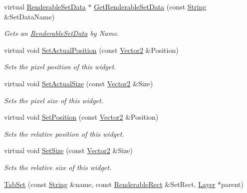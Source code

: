 \begin{DoxyCompactItemize}
virtual \hyperlink{structMezzanine_1_1UI_1_1RenderableSetData}{RenderableSetData} $\ast$ \hyperlink{classMezzanine_1_1UI_1_1TabSet_ab70db8423339f4ad5c11070201e42cc2}{GetRenderableSetData} (const \hyperlink{namespaceMezzanine_acf9fcc130e6ebf08e3d8491aebcf1c86}{String} \&SetDataName)
\begin{DoxyCompactList}\small\item\em Gets an \hyperlink{structMezzanine_1_1UI_1_1RenderableSetData}{RenderableSetData} by Name. \item\end{DoxyCompactList}\item 
virtual void \hyperlink{classMezzanine_1_1UI_1_1TabSet_ac4cb545982397148d0df237eee062cb3}{SetActualPosition} (const \hyperlink{classMezzanine_1_1Vector2}{Vector2} \&Position)
\begin{DoxyCompactList}\small\item\em Sets the pixel position of this widget. \item\end{DoxyCompactList}\item 
virtual void \hyperlink{classMezzanine_1_1UI_1_1TabSet_a1093eb0ab0b862665cfb567bb5d73341}{SetActualSize} (const \hyperlink{classMezzanine_1_1Vector2}{Vector2} \&Size)
\begin{DoxyCompactList}\small\item\em Sets the pixel size of this widget. \item\end{DoxyCompactList}\item 
virtual void \hyperlink{classMezzanine_1_1UI_1_1TabSet_a7474438cae418c74f192dc48ad5a4170}{SetPosition} (const \hyperlink{classMezzanine_1_1Vector2}{Vector2} \&Position)
\begin{DoxyCompactList}\small\item\em Sets the relative position of this widget. \item\end{DoxyCompactList}\item 
virtual void \hyperlink{classMezzanine_1_1UI_1_1TabSet_ac125a2abc7b12d3c81969bdd407be883}{SetSize} (const \hyperlink{classMezzanine_1_1Vector2}{Vector2} \&Size)
\begin{DoxyCompactList}\small\item\em Sets the relative size of this widget. \item\end{DoxyCompactList}\item 
\hyperlink{classMezzanine_1_1UI_1_1TabSet_a4ae5a3399c55d8c0d1933e8ddd30f582}{TabSet} (const \hyperlink{namespaceMezzanine_acf9fcc130e6ebf08e3d8491aebcf1c86}{String} \&name, const \hyperlink{structMezzanine_1_1UI_1_1RenderableRect}{RenderableRect} \&SetRect, \hyperlink{classMezzanine_1_1UI_1_1Layer}{Layer} $\ast$parent)

\end{DoxyCompactItemize}
